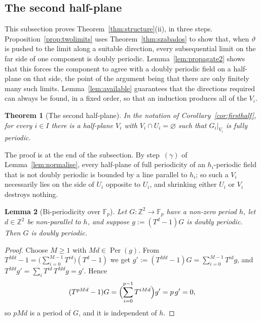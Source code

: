 \documentclass[11pt,reqno]{amsart}
\theoremstyle{plain}
\newtheorem{thm}{Theorem}[section]
\newtheorem{lem}[thm]{Lemma}
\theoremstyle{definition}
\theoremstyle{remark}
\theoremstyle{plain}
\theoremstyle{remark}
\theoremstyle{definition}
\numberwithin{equation}{section}
\DeclareMathOperator{\Per}{Per}
\newcommand{\Z}{\mathbb{Z}}
\newcommand{\Fp}{\mathbb{F}_p}
\begin{document}
\subsection{The second half-plane}\label{ssec:secondhalf}

This subsection proves Theorem~\ref{thm:structure}(ii), in three steps.
Proposition~\ref{prop:twolimits} uses Theorem~\ref{thm:szabados} to show that,
when $\vartheta$ is pushed to the limit along a suitable direction, every
subsequential limit on the far side of one component is doubly periodic.
Lemma~\ref{lem:propagate2} shows that this forces the component to agree with a
doubly periodic field on a half-plane on that side, the point of the argument
being that there are only finitely many such limits.
Lemma~\ref{lem:available} guarantees that the directions required can always be
found, in a fixed order, so that an induction produces all of the $V_i$.

\begin{thm}[The second half-plane]\label{thm:secondhalf}
In the notation of Corollary~\ref{cor:firsthalf}, for every $i\in I$ there is a
half-plane $V_i$ with $V_i\cap U_i=\varnothing$ such that $G_i|_{V_i}$ is fully
periodic.
\end{thm}

The proof is at the end of the subsection.  By step~$(\gamma)$ of
Lemma~\ref{lem:normalise}, every half-plane of full periodicity of an
$h_i$-periodic field that is not doubly periodic is bounded by a line parallel
to $h_i$; so such a $V_i$ necessarily lies on the side of $U_i$ opposite to
$U_i$, and shrinking either $U_i$ or $V_i$ destroys nothing.

\begin{lem}[Bi-periodicity over $\Fp$]\label{lem:biper}
Let $G\colon\Z^2\to\Fp$ have a non-zero period $h$, let $d\in\Z^2$ be
non-parallel to $h$, and suppose $g:=(T^d-1)G$ is doubly periodic.  Then $G$ is
doubly periodic.
\end{lem}

\begin{proof}
Choose $M\ge1$ with $Md\in\Per(g)$.  From
$T^{Md}-1=\bigl(\sum_{i=0}^{M-1}T^{id}\bigr)(T^d-1)$ we get
$g':=(T^{Md}-1)G=\sum_{i=0}^{M-1}T^{id}g$, and
$T^{Md}g'=\sum_iT^{id}\,T^{Md}g=g'$.  Hence
\[(T^{pMd}-1)G=\Bigl(\sum_{i=0}^{p-1}T^{iMd}\Bigr)g'=p\,g'=0,\]
so $pMd$ is a period of $G$, and it is independent of $h$.
\end{proof}
\end{document}
